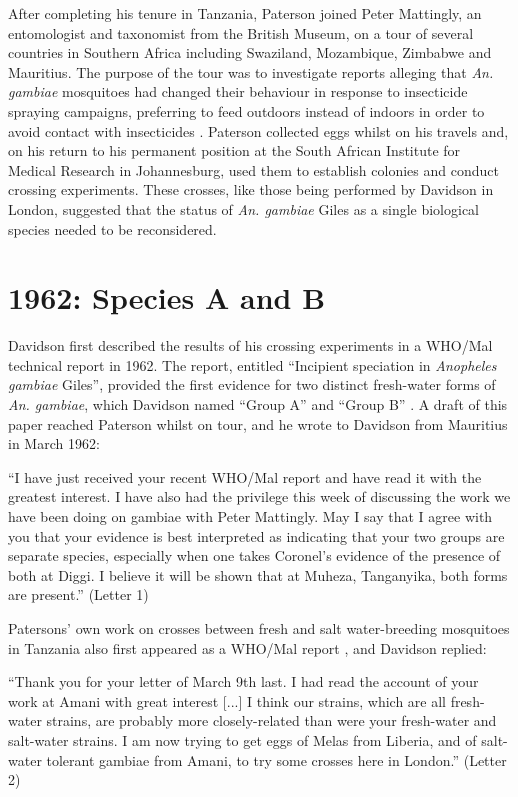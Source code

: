 \documentclass[a4paper,11pt,abstracton,hidelinks]{scrartcl}
\begin{document}
After completing his tenure in Tanzania, Paterson joined Peter Mattingly, an entomologist and taxonomist from the British Museum, on a tour of several countries in Southern Africa including Swaziland, Mozambique, Zimbabwe and Mauritius.
%
The purpose of the tour was to investigate reports alleging that \textit{An. gambiae} mosquitoes had changed their behaviour in response to insecticide spraying campaigns, preferring to feed outdoors instead of indoors in order to avoid contact with insecticides \citep{Mattingly1963}.
%
Paterson collected eggs whilst on his travels and, on his return to his permanent position at the South African Institute for Medical Research in Johannesburg, used them to establish colonies and conduct crossing experiments.
%
These crosses, like those being performed by Davidson in London, suggested that the status of \textit{An. gambiae} Giles as a single biological species needed to be reconsidered.


\section{1962: Species A and B}

Davidson first described the results of his crossing experiments in a WHO/Mal technical report in 1962.
%
The report, entitled ``Incipient speciation in \textit{Anopheles gambiae} Giles'', 
provided the first evidence for two distinct fresh-water forms of \textit{An. gambiae}, which Davidson named ``Group A'' and ``Group B'' \citep{Davidson1962a}.
%
A draft of this paper reached Paterson whilst on tour, and he wrote to Davidson from Mauritius in March 1962:
%
\begin{displayquote}
``I have just received your recent WHO/Mal report and have read it with the greatest interest.
%
I have also had the privilege this week of discussing the work we have been doing on gambiae with Peter Mattingly.
%
May I say that I agree with you that your evidence is best interpreted as indicating that your two groups are separate species, especially when one takes Coronel's evidence of the presence of both at Diggi.
%
I believe it will be shown that at Muheza, Tanganyika, both forms are present.'' (Letter 1)
\end{displayquote}


Patersons' own work on crosses between fresh and salt water-breeding mosquitoes in Tanzania also first appeared as a WHO/Mal report \citep{Paterson1962a}, and Davidson replied:
%
\begin{displayquote}
``Thank you for your letter of March 9th last. 
%
I had read the account of your work at Amani with great interest [...] I think our strains, which are all fresh-water strains, are probably more closely-related than were your fresh-water and salt-water strains.
%
I am now trying to get eggs of Melas from Liberia, and of salt-water tolerant gambiae from Amani, to try some crosses here in London.'' (Letter 2)
\end{displayquote}
\end{document}
